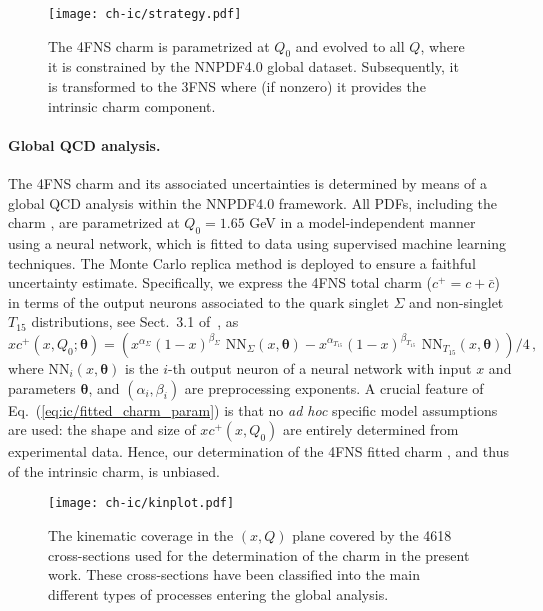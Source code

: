 \begin{figure}[h]
\begin{center}
  \texttt{[image: ch-ic/strategy.pdf]}
 \end{center}
\vspace{-0.2cm}
\caption{The 4FNS charm \pdf is parametrized  at $Q_0$
  and evolved to all  $Q$, where it is  constrained by the NNPDF4.0
  global dataset. 
 Subsequently, it is transformed to the 3FNS where (if nonzero) it
 provides the intrinsic charm component.
  \label{fig:ic/strategy}
}
\end{figure}

\paragraph{Global QCD analysis.}
%
The 4FNS charm \pdf and its associated
uncertainties is determined by means of a global QCD analysis
within the NNPDF4.0 framework.
%
All PDFs, including the charm \pdf, are  parametrized at $Q_0=1.65$ GeV in 
a model-independent manner using a neural network, which is fitted to data using 
supervised machine learning techniques.
The Monte Carlo replica method
is deployed to ensure a faithful uncertainty estimate.
%
Specifically, we express the 4FNS total charm \pdf ($c^+=c+\bar{c}$)  in terms of the output neurons associated to the quark singlet $\Sigma$ and non-singlet $T_{15}$
distributions, see Sect.~3.1 of~\cite{Ball:2021leu}, as
\begin{equation}
\label{eq:ic/fitted_charm_param}
xc^+(x,Q_0;{\boldsymbol \theta}) =
\left( x^{\alpha_{\Sigma}}(1-x)^{\beta_{\Sigma}} \textrm{ NN}_{\Sigma}(x,{\boldsymbol \theta})-
x^{\alpha_{T_{15}}}(1-x)^{\beta_{T_{15}}} \textrm{ NN}_{T_{15}}(x,{\boldsymbol \theta})
\right)/4 \, ,
\end{equation}
where $\textrm{NN}_{i}(x,{\boldsymbol \theta})$ is the $i$-th output neuron of
a neural network with input $x$ and  parameters ${\boldsymbol \theta}$, and 
$\left(\alpha_i,\beta_i\right)$ are preprocessing exponents.
%
A crucial feature of Eq.~(\ref{eq:ic/fitted_charm_param}) is that no \textit{
ad hoc} specific model assumptions are used: the shape and size of
$xc^+(x,Q_0)$ are entirely determined from experimental data.
%
Hence, our determination of the 4FNS fitted charm \pdf, and thus of the intrinsic charm, is unbiased.
%

\begin{figure}[t]
\begin{center}
  \texttt{[image: ch-ic/kinplot.pdf]}
 \end{center}
\vspace{-0.8cm}
\caption{The kinematic coverage in the $(x,Q)$ plane
  covered by the 4618 cross-sections used for the
  determination of the charm \pdf in the present work.
  These cross-sections have been classified into the main different
  types of processes entering the global analysis.
  \label{fig:ic/kinplot}
}
\end{figure}


